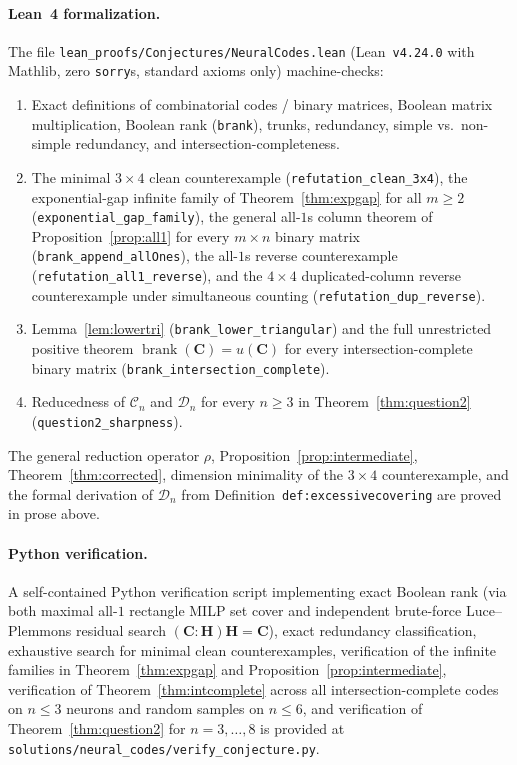 \documentclass[11pt]{article}
\theoremstyle{plain}
\theoremstyle{definition}
\theoremstyle{remark}
\DeclareMathOperator{\brank}{brank}
\begin{document}
\paragraph{Lean~4 formalization.}
The file \texttt{lean\_proofs/Conjectures/NeuralCodes.lean} (Lean~\texttt{v4.24.0} with Mathlib, zero \texttt{sorry}s, standard axioms only) machine-checks:
\begin{enumerate}[label=\textup{(\arabic*)}]
\item Exact definitions of combinatorial codes / binary matrices, Boolean matrix multiplication, Boolean rank (\texttt{brank}), trunks, redundancy, simple vs.\ non-simple redundancy, and intersection-completeness.
\item The minimal $3 \times 4$ clean counterexample (\texttt{refutation\_clean\_3x4}), the exponential-gap infinite family of Theorem~\ref{thm:expgap} for all $m \ge 2$ (\texttt{exponential\_gap\_family}), the general all-$1$s column theorem of Proposition~\ref{prop:all1} for every $m \times n$ binary matrix (\texttt{brank\_append\_allOnes}), the all-$1$s reverse counterexample (\texttt{refutation\_all1\_reverse}), and the $4 \times 4$ duplicated-column reverse counterexample under simultaneous counting (\texttt{refutation\_dup\_reverse}).
\item Lemma~\ref{lem:lowertri} (\texttt{brank\_lower\_triangular}) and the full unrestricted positive theorem $\brank(\mathbf{C}) = u(\mathbf{C})$ for every intersection-complete binary matrix (\texttt{brank\_intersection\_complete}).
\item Reducedness of $\mathcal{C}_n$ and $\mathcal{D}_n$ for every $n \ge 3$ in Theorem~\ref{thm:question2} (\texttt{question2\_sharpness}).
\end{enumerate}
The general reduction operator $\rho$, Proposition~\ref{prop:intermediate}, Theorem~\ref{thm:corrected}, dimension minimality of the $3 \times 4$ counterexample, and the formal derivation of $\mathcal{D}_n$ from Definition~\texttt{def:excessivecovering} are proved in prose above.

\paragraph{Python verification.}
A self-contained Python verification script implementing exact Boolean rank (via both maximal all-$1$ rectangle MILP set cover and independent brute-force Luce--Plemmons residual search $(\mathbf{C}:\mathbf{H})\mathbf{H} = \mathbf{C}$), exact redundancy classification, exhaustive search for minimal clean counterexamples, verification of the infinite families in Theorem~\ref{thm:expgap} and Proposition~\ref{prop:intermediate}, verification of Theorem~\ref{thm:intcomplete} across all intersection-complete codes on $n \le 3$ neurons and random samples on $n \le 6$, and verification of Theorem~\ref{thm:question2} for $n = 3, \dots, 8$ is provided at \texttt{solutions/neural\_codes/verify\_conjecture.py}.
\end{document}
